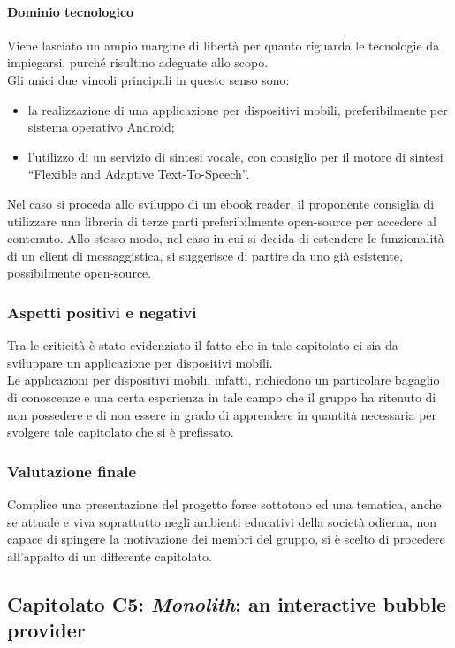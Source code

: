 			\paragraph{Dominio tecnologico}
			Viene lasciato un ampio margine di libertà per quanto riguarda le tecnologie da impiegarsi, purché risultino adeguate allo scopo. 
			\\Gli unici due vincoli principali in questo senso sono:
			\begin{itemize}
			\item la realizzazione di una applicazione per dispositivi mobili, preferibilmente per sistema operativo Android;
			\item l'utilizzo di un servizio di sintesi vocale, con consiglio per il motore di sintesi “Flexible and Adaptive Text-To-Speech”.
			\end{itemize}
			Nel caso si proceda allo sviluppo di un ebook reader, il proponente consiglia di utilizzare una libreria di terze parti preferibilmente 
			open-source per accedere al contenuto. Allo stesso modo, nel caso in cui si decida di estendere le funzionalità di un client di messaggistica, 
			si suggerisce di partire da uno già esistente, possibilmente open-source.
		\subsubsection{Aspetti positivi e negativi}
		Tra le criticità è stato evidenziato il fatto che in tale capitolato ci sia da sviluppare un applicazione per dispositivi mobili.
		\\Le applicazioni per dispositivi mobili, infatti, richiedono un particolare bagaglio di conoscenze e una certa esperienza in tale campo che
		il gruppo ha ritenuto di non possedere e di non essere in grado di apprendere in quantità necessaria per svolgere tale capitolato che si è prefissato.
		
		\subsubsection{Valutazione finale}
		Complice una presentazione del progetto forse sottotono ed una tematica, anche se attuale e viva soprattutto negli ambienti 
		educativi della società odierna, non capace di spingere la motivazione dei membri del gruppo, si è scelto di procedere all'appalto di un 
		differente capitolato.
		
	\subsection{Capitolato C5: \emph{Monolith}: an interactive bubble provider}
